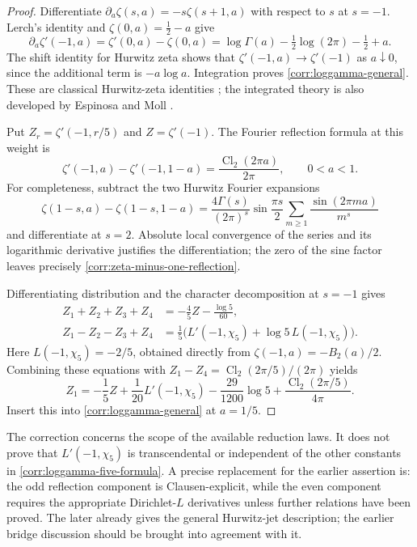 \begin{proof}
Differentiate $\partial_a\zeta(s,a)=-s\zeta(s+1,a)$ with respect to
$s$ at $s=-1$.  Lerch's identity and $\zeta(0,a)=\tfrac12-a$ give
\[
 \partial_a\zeta'(-1,a)
 =\zeta'(0,a)-\zeta(0,a)
 =\log\Gamma(a)-\tfrac12\log(2\pi)-\tfrac12+a.
\]
The shift identity for Hurwitz zeta shows that
$\zeta'(-1,a)\to\zeta'(-1)$ as $a\downarrow0$, since the additional
term is $-a\log a$.  Integration proves
\eqref{corr:loggamma-general}.  These are classical Hurwitz-zeta
identities \cite{DLMF25}; the integrated theory is also developed by
Espinosa and Moll \cite{EspinosaMoll2002b}.

Put $Z_r=\zeta'(-1,r/5)$ and $Z=\zeta'(-1)$.  The Fourier reflection
formula at this weight is
\begin{equation}\label{corr:zeta-minus-one-reflection}
 \zeta'(-1,a)-\zeta'(-1,1-a)
       =\frac{\operatorname{Cl}_2(2\pi a)}{2\pi},
       \qquad 0<a<1.
\end{equation}
For completeness, subtract the two Hurwitz Fourier expansions
\[
 \zeta(1-s,a)-\zeta(1-s,1-a)
 =\frac{4\Gamma(s)}{(2\pi)^s}\sin\frac{\pi s}{2}
       \sum_{m\geq1}\frac{\sin(2\pi ma)}{m^s}
\]
and differentiate at $s=2$.  Absolute local convergence of the
series and its logarithmic derivative justifies the differentiation;
the zero of the sine factor leaves precisely
\eqref{corr:zeta-minus-one-reflection}.

Differentiating distribution and the character decomposition at $s=-1$
gives
\begin{align*}
 Z_1+Z_2+Z_3+Z_4&=-\frac45 Z-\frac{\log5}{60},\\
 Z_1-Z_2-Z_3+Z_4
   &=\frac15\bigl(L'(-1,\chi_5)+\log5\,L(-1,\chi_5)\bigr).
\end{align*}
Here $L(-1,\chi_5)=-2/5$, obtained directly from
$\zeta(-1,a)=-B_2(a)/2$.  Combining these equations with
$Z_1-Z_4=\operatorname{Cl}_2(2\pi/5)/(2\pi)$ yields
\[
 Z_1=-\frac15 Z+\frac1{20}L'(-1,\chi_5)
       -\frac{29}{1200}\log5
       +\frac{\operatorname{Cl}_2(2\pi/5)}{4\pi}.
\]
Insert this into \eqref{corr:loggamma-general} at $a=1/5$.
\end{proof}

The correction concerns the scope of the available reduction laws.
It does not prove that $L'(-1,\chi_5)$ is transcendental or independent
of the other constants in \eqref{corr:loggamma-five-formula}.  A precise
replacement for the earlier assertion is: the odd reflection component
is Clausen-explicit, while the even component requires the appropriate
Dirichlet-$L$ derivatives unless further relations have been proved.
The later  already gives the
general Hurwitz-jet description; the earlier bridge discussion should
be brought into agreement with it.

